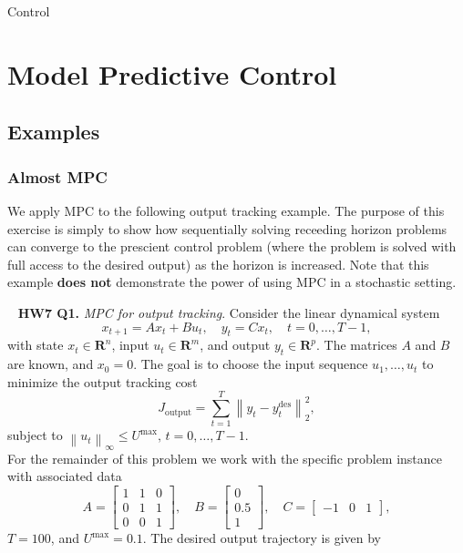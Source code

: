 \begin{chapter}{Control}
    \section{Model Predictive Control}



    \subsection{Examples}


    \subsubsection*{Almost MPC}
    We apply MPC to the following output tracking example. The purpose of this exercise is simply to show
    how sequentially solving receeding horizon problems can converge to the prescient control problem (where
    the problem is solved with full access to the desired output) as the horizon is increased.
    Note that this example \textbf{does not} demonstrate the power of using MPC in a stochastic setting.

    \noindent~\cite{EE364b} \textbf{HW7 Q1.} \textit{MPC for output tracking}. Consider the linear dynamical system
    \[x_{t+1} = Ax_t + Bu_t, \quad y_t = Cx_t, \quad t = 0, \ldots, T-1,\]
    with state $x_t \in \mathbf{R}^n$, input $u_t \in \mathbf{R}^m$, and output $y_t \in \mathbf{R}^p$.
    The matrices $A$ and $B$ are known, and $x_0=0$. The goal is to choose the input sequence $u_1, \ldots, u_t$
    to minimize the output tracking cost
    \[J_{\text{output}} = \sum_{t=1}^{T}\left\lVert y_t - y_t^{\text{des}} \right\rVert_{2}^2,\]
    subject to $\left\lVert u_t \right\rVert_{\infty} \le U^{\text{max}}, \, t=0, \ldots, T-1$. \\
    For the remainder of this problem we work with the specific problem instance with associated data
    \[A = \begin{bmatrix}
        1 & 1 & 0 \\ 0 & 1 & 1 \\ 0 & 0 & 1
    \end{bmatrix}, \quad
    B = \begin{bmatrix}
        0 \\ 0.5 \\ 1
    \end{bmatrix}, \quad
    C = \begin{bmatrix}
        -1 & 0 & 1
    \end{bmatrix},\]
    $T=100$, and $U^{\text{max}} = 0.1$. The desired output trajectory is given by


\end{chapter}
